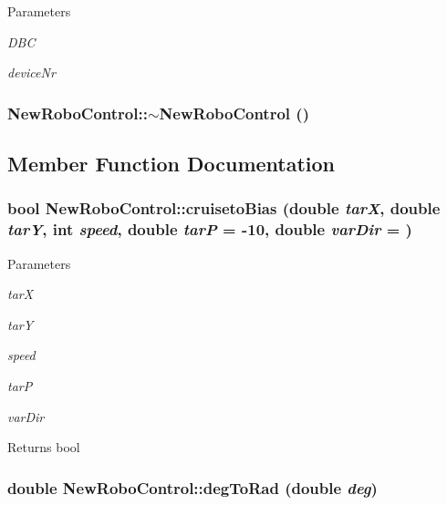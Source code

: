 \begin{DoxyParams}{Parameters}
\item[{\em DBC}]\item[{\em deviceNr}]\end{DoxyParams}
\hypertarget{classNewRoboControl_ae63cbd6c60d37882d176e9e7d60b11ba}{
\subsubsection[{$\sim$NewRoboControl}]{\setlength{\rightskip}{0pt plus 5cm}NewRoboControl::$\sim$NewRoboControl ()}}
\label{classNewRoboControl_ae63cbd6c60d37882d176e9e7d60b11ba}


\subsection{Member Function Documentation}
\hypertarget{classNewRoboControl_a89119d6af9d59b6e0279b39e23c35122}{
\subsubsection[{cruisetoBias}]{\setlength{\rightskip}{0pt plus 5cm}bool NewRoboControl::cruisetoBias (double {\em tarX}, \/  double {\em tarY}, \/  int {\em speed}, \/  double {\em tarP} = {\ttfamily -\/10}, \/  double {\em varDir} = {})}}
\label{classNewRoboControl_a89119d6af9d59b6e0279b39e23c35122}

\begin{DoxyParams}{Parameters}
\item[{\em tarX}]\item[{\em tarY}]\item[{\em speed}]\item[{\em tarP}]\item[{\em varDir}]\end{DoxyParams}
\begin{DoxyReturn}{Returns}
bool 
\end{DoxyReturn}
\hypertarget{classNewRoboControl_a44def2cefef0f6c41b180bda044dfdfb}{
\subsubsection[{degToRad}]{\setlength{\rightskip}{0pt plus 5cm}double NewRoboControl::degToRad (double {\em deg})}}
\label{classNewRoboControl_a44def2cefef0f6c41b180bda044dfdfb}

